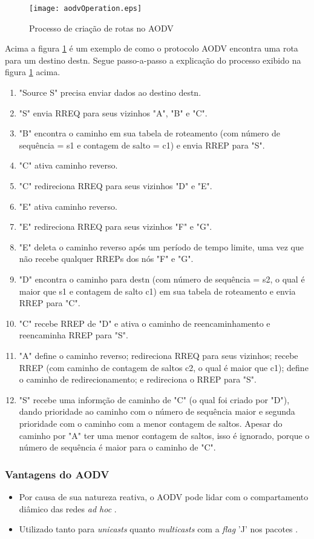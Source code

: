 \begin{figure}[H]
	\centering
	\texttt{[image: aodvOperation.eps]}
	\caption{Processo de cria\c{c}\~ao de rotas no AODV \cite{gorantala}}
	\label{figOpAODV}
\end{figure}
Acima a figura \ref{figOpAODV} \'e um exemplo de como o protocolo AODV encontra uma rota para um destino destn.
Segue passo-a-passo a explica\c{c}\~ao do processo exibido na figura \ref{figOpAODV} acima.
\begin{enumerate}
	\item "Source S" precisa enviar dados ao destino destn.
	\item "S" envia RREQ para seus vizinhos "A", "B" e "C".
	\item "B" encontra o caminho em sua tabela de roteamento (com n\'umero de sequ\^encia = s1 e contagem de salto = c1) e envia RREP para "S".
	\item "C" ativa caminho reverso.
	\item "C" redireciona RREQ para seus vizinhos "D" e "E".
	\item "E" ativa caminho reverso.
	\item "E" redireciona RREQ para seus vizinhos "F" e "G".
	\item "E" deleta o caminho reverso ap\'os um per\'iodo de tempo limite, uma vez que n\~ao recebe qualquer RREPs dos n\'os "F" e "G".
	\item "D" encontra o caminho para destn (com n\'umero de sequ\^encia = s2, o qual \'e maior que s1 e contagem de salto c1) em sua tabela de roteamento e envia RREP para "C".
	\item "C" recebe RREP de "D" e ativa o caminho de reencaminhamento e reencaminha RREP para "S".
	\item "A" define o caminho reverso; redireciona RREQ para seus vizinhos; recebe RREP (com caminho de contagem de saltos c2, o qual \'e maior que c1); define o caminho de redirecionamento; e redireciona o RREP para "S".
	\item "S" recebe uma inform\c{c}\~ao de caminho de "C" (o qual foi criado por "D"), dando prioridade ao caminho com o n\'umero de sequ\^encia maior e segunda prioridade com o caminho com a menor contagem de saltos. Apesar do caminho por "A" ter uma menor contagem de saltos, isso \'e ignorado, porque o n\'umero de sequ\^encia \'e maior para o caminho de "C".
\end{enumerate}

\subsubsection{Vantagens do AODV}
\begin{itemize}
	\item Por causa de sua natureza reativa, o AODV pode lidar com o compartamento di\^amico das redes \textit{ad hoc} \cite{schwingenschlogl}.
	\item Utilizado tanto para \textit{unicasts} quanto \textit{multicasts} com a \textit{flag} 'J' nos pacotes \cite{ramachandranTech}.
\end{itemize}

